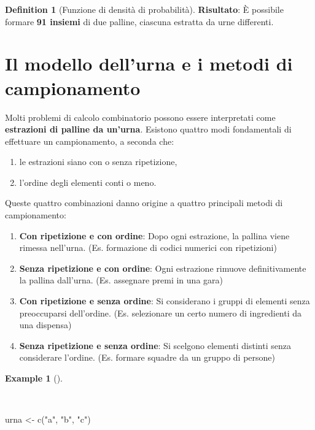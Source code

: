 \documentclass[
  letterpaper,
  DIV=11,
  numbers=noendperiod,
  oneside]{scrreprt}
\newenvironment{Shaded}{\begin{snugshade}}{\end{snugshade}}
\newcommand{\FunctionTok}[1]{\textcolor[rgb]{0.28,0.35,0.67}{#1}}
\newcommand{\NormalTok}[1]{\textcolor[rgb]{0.00,0.23,0.31}{#1}}
\newcommand{\OtherTok}[1]{\textcolor[rgb]{0.00,0.23,0.31}{#1}}
\newcommand{\StringTok}[1]{\textcolor[rgb]{0.13,0.47,0.30}{#1}}
\providecommand{\tightlist}{%
  \setlength{\itemsep}{0pt}\setlength{\parskip}{0pt}}
\theoremstyle{definition}
\newtheorem{example}{Example}[chapter]
\theoremstyle{plain}
\theoremstyle{definition}
\newtheorem{definition}{Definition}[chapter]
\theoremstyle{remark}
\begin{document}
\begin{definition}[Funzione di densità di
probabilità]
\textbf{Risultato}: È possibile formare \textbf{91 insiemi} di due
palline, ciascuna estratta da urne differenti.

\section{Il modello dell'urna e i metodi di
campionamento}\label{il-modello-dellurna-e-i-metodi-di-campionamento}

Molti problemi di calcolo combinatorio possono essere interpretati come
\textbf{estrazioni di palline da un'urna}. Esistono quattro modi
fondamentali di effettuare un campionamento, a seconda che:

\begin{enumerate}
\def\labelenumi{\arabic{enumi}.}
\tightlist
\item
  le estrazioni siano con o senza ripetizione,
\item
  l'ordine degli elementi conti o meno.
\end{enumerate}

Queste quattro combinazioni danno origine a quattro principali metodi di
campionamento:

\begin{enumerate}
\def\labelenumi{\arabic{enumi}.}
\tightlist
\item
  \textbf{Con ripetizione e con ordine}: Dopo ogni estrazione, la
  pallina viene rimessa nell'urna. (Es. formazione di codici numerici
  con ripetizioni)
\item
  \textbf{Senza ripetizione e con ordine}: Ogni estrazione rimuove
  definitivamente la pallina dall'urna. (Es. assegnare premi in una
  gara)
\item
  \textbf{Con ripetizione e senza ordine}: Si considerano i gruppi di
  elementi senza preoccuparsi dell'ordine. (Es. selezionare un certo
  numero di ingredienti da una dispensa)
\item
  \textbf{Senza ripetizione e senza ordine}: Si scelgono elementi
  distinti senza considerare l'ordine. (Es. formare squadre da un gruppo
  di persone)
\end{enumerate}

\begin{example}[]\protect\hypertarget{exm-}{}\label{exm-}

~

\begin{Shaded}
\begin{Highlighting}[]
\NormalTok{urna }\OtherTok{\textless{}{-}} \FunctionTok{c}\NormalTok{(}\StringTok{"a"}\NormalTok{, }\StringTok{"b"}\NormalTok{, }\StringTok{"c"}\NormalTok{)}


\end{Highlighting}
\end{Shaded}
\end{example}
\end{definition}
\end{document}
